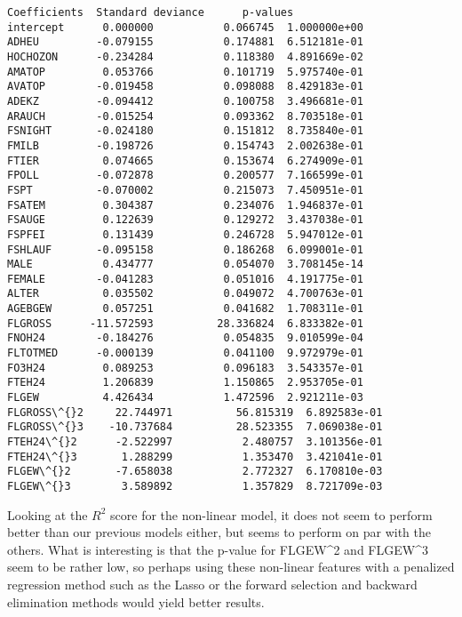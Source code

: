 \documentclass[11pt]{article}
\makeatletter
\newcommand{\boxspacing}{\kern\kvtcb@left@rule\kern\kvtcb@boxsep}
\newcommand{\prompt}[4]{
        \ttfamily\llap{{\color{#2}[#3]:\hspace{3pt}#4}}\vspace{-\baselineskip}
    }
\makeatother
\begin{document}
            \begin{tcolorbox}[breakable, size=fbox, boxrule=.5pt, pad at break*=1mm, opacityfill=0]
\prompt{Out}{outcolor}{48}{\boxspacing}
\begin{Verbatim}[commandchars=\\\{\}]
           Coefficients  Standard deviance      p-values
intercept      0.000000           0.066745  1.000000e+00
ADHEU         -0.079155           0.174881  6.512181e-01
HOCHOZON      -0.234284           0.118380  4.891669e-02
AMATOP         0.053766           0.101719  5.975740e-01
AVATOP        -0.019458           0.098088  8.429183e-01
ADEKZ         -0.094412           0.100758  3.496681e-01
ARAUCH        -0.015254           0.093362  8.703518e-01
FSNIGHT       -0.024180           0.151812  8.735840e-01
FMILB         -0.198726           0.154743  2.002638e-01
FTIER          0.074665           0.153674  6.274909e-01
FPOLL         -0.072878           0.200577  7.166599e-01
FSPT          -0.070002           0.215073  7.450951e-01
FSATEM         0.304387           0.234076  1.946837e-01
FSAUGE         0.122639           0.129272  3.437038e-01
FSPFEI         0.131439           0.246728  5.947012e-01
FSHLAUF       -0.095158           0.186268  6.099001e-01
MALE           0.434777           0.054070  3.708145e-14
FEMALE        -0.041283           0.051016  4.191775e-01
ALTER          0.035502           0.049072  4.700763e-01
AGEBGEW        0.057251           0.041682  1.708311e-01
FLGROSS      -11.572593          28.336824  6.833382e-01
FNOH24        -0.184276           0.054835  9.010599e-04
FLTOTMED      -0.000139           0.041100  9.972979e-01
FO3H24         0.089253           0.096183  3.543357e-01
FTEH24         1.206839           1.150865  2.953705e-01
FLGEW          4.426434           1.472596  2.921211e-03
FLGROSS\^{}2     22.744971          56.815319  6.892583e-01
FLGROSS\^{}3    -10.737684          28.523355  7.069038e-01
FTEH24\^{}2      -2.522997           2.480757  3.101356e-01
FTEH24\^{}3       1.288299           1.353470  3.421041e-01
FLGEW\^{}2       -7.658038           2.772327  6.170810e-03
FLGEW\^{}3        3.589892           1.357829  8.721709e-03
\end{Verbatim}
\end{tcolorbox}
        
    Looking at the \(R^2\) score for the non-linear model, it does not seem
to perform better than our previous models either, but seems to perform
on par with the others. What is interesting is that the p-value for
FLGEW\^{}2 and FLGEW\^{}3 seem to be rather low, so perhaps using these
non-linear features with a penalized regression method such as the Lasso
or the forward selection and backward elimination methods would yield
better results.
\end{document}
